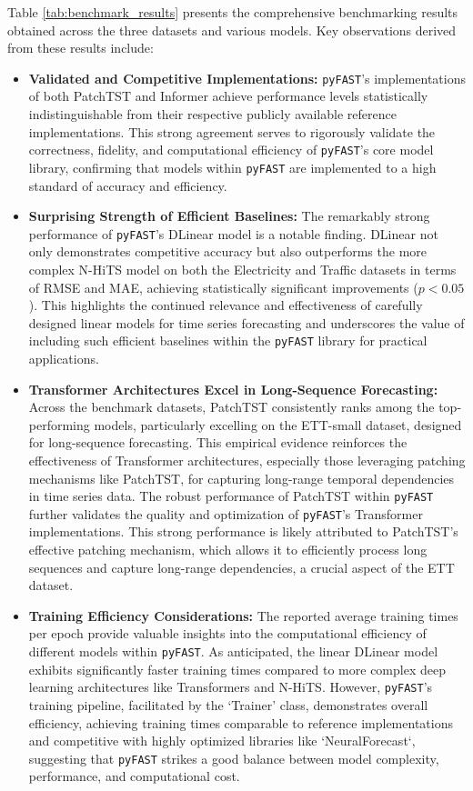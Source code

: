 \documentclass[twoside,11pt]{article}
\begin{document}
Table \ref{tab:benchmark_results} presents the comprehensive benchmarking results obtained across the three datasets and various models.  Key observations derived from these results include:

\begin{itemize}
    \item   \textbf{Validated and Competitive Implementations:} \texttt{pyFAST}'s implementations of both PatchTST and Informer achieve performance levels statistically indistinguishable from their respective publicly available reference implementations. This strong agreement serves to rigorously validate the correctness, fidelity, and computational efficiency of \texttt{pyFAST}'s core model library, confirming that models within \texttt{pyFAST} are implemented to a high standard of accuracy and efficiency.
    \item   \textbf{Surprising Strength of Efficient Baselines:}  The remarkably strong performance of \texttt{pyFAST}'s DLinear model is a notable finding.  DLinear not only demonstrates competitive accuracy but also outperforms the more complex N-HiTS model on both the Electricity and Traffic datasets in terms of RMSE and MAE, achieving statistically significant improvements ($p<0.05$).  This highlights the continued relevance and effectiveness of carefully designed linear models for time series forecasting and underscores the value of including such efficient baselines within the \texttt{pyFAST} library for practical applications.
    \item    \textbf{Transformer Architectures Excel in Long-Sequence Forecasting:}  Across the benchmark datasets, PatchTST consistently ranks among the top-performing models, particularly excelling on the ETT-small dataset, designed for long-sequence forecasting. This empirical evidence reinforces the effectiveness of Transformer architectures, especially those leveraging patching mechanisms like PatchTST, for capturing long-range temporal dependencies in time series data.  The robust performance of PatchTST within \texttt{pyFAST} further validates the quality and optimization of \texttt{pyFAST}'s Transformer implementations.  This strong performance is likely attributed to PatchTST's effective patching mechanism, which allows it to efficiently process long sequences and capture long-range dependencies, a crucial aspect of the ETT dataset.
    \item   \textbf{Training Efficiency Considerations:}  The reported average training times per epoch provide valuable insights into the computational efficiency of different models within \texttt{pyFAST}. As anticipated, the linear DLinear model exhibits significantly faster training times compared to more complex deep learning architectures like Transformers and N-HiTS.  However, \texttt{pyFAST}'s training pipeline, facilitated by the `Trainer' class, demonstrates overall efficiency, achieving training times comparable to reference implementations and competitive with highly optimized libraries like `NeuralForecast`, suggesting that \texttt{pyFAST} strikes a good balance between model complexity, performance, and computational cost.
     

\end{itemize}
\end{document}
